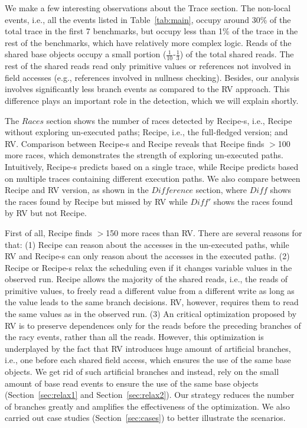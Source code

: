 We make a few interesting observations about the Trace section. 
The non-local events, i.e., all the events listed in Table~\ref{tab:main}, 
occupy around 30\% of the total trace in the first 7 benchmarks, 
but occupy less than 1\% of the trace in the rest of the benchmarks, 
which have relatively more complex logic. Reads of the shared base objects 
occupy a small portion ($\frac{1}{10}$-$\frac{1}{3}$) of the total 
shared reads. The rest of the shared reads read only primitive values 
or references not involved in field accesses (e.g., references involved 
in nullness checking). Besides, our analysis involves significantly less branch events as compared to the {\sf RV} approach. This difference plays an important role in the detection, which we will explain shortly.


The $Races$ section shows the number of races detected by {\sf Recipe-s}, 
i.e., {\sf Recipe} without exploring un-executed paths; {\sf Recipe}, i.e., the full-fledged version; and {\sf RV}. Comparison between {\sf Recipe-s} 
and {\sf Recipe} reveals that {\sf Recipe} finds $>$100 more races, 
which demonstrates the strength of exploring  un-executed paths. 
Intuitively,  {\sf Recipe-s} predicts based on a single trace, while 
{\sf Recipe} predicts based on multiple traces containing different 
execution paths. We also compare between {\sf Recipe} and {\sf RV} version, 
as shown in the $Difference$ section, where $Diff$ shows the races found 
by {\sf Recipe} but missed by {\sf RV} while $Diff'$ shows the races 
found by {\sf RV} but not {\sf Recipe}.

First of all, {\sf Recipe} finds $>$150 more races than {\sf RV}. There 
are several reasons for that: (1) {\sf Recipe} can reason about the 
accesses in the un-executed paths, while {\sf RV} and {\sf Recipe-s} can 
only reason about the accesses in the executed paths. (2) {\sf Recipe} 
or {\sf Recipe-s} relax the scheduling even if it 
changes variable values in the observed run. {\sf Recipe} allows the 
majority of the shared reads, i.e., the reads of primitive values, 
to freely read a different value from a different write 
as long as the value leads to the same branch decisions. {\sf RV}, however, 
requires them to read the same values as in the observed run. (3) An 
critical optimization proposed by {\sf RV} is to preserve dependences 
only for the reads before the preceding branches of the racy events, 
rather than all the reads. However, this optimization is underplayed 
by the fact that {\sf RV} introduces huge amount of artificial 
branches, i.e., one before each shared field access, which ensures 
the use of the same base objects.
We get rid of such artificial branches and instead, rely on the small 
amount of base read events to ensure the use of the same base 
objects (Section~\ref{sec:relax1} and Section~\ref{sec:relax2}). Our strategy reduces the number of branches 
greatly and amplifies the effectiveness of the optimization. We also 
carried out case studies (Section~\ref{sec:cases}) to better illustrate the scenarios.

